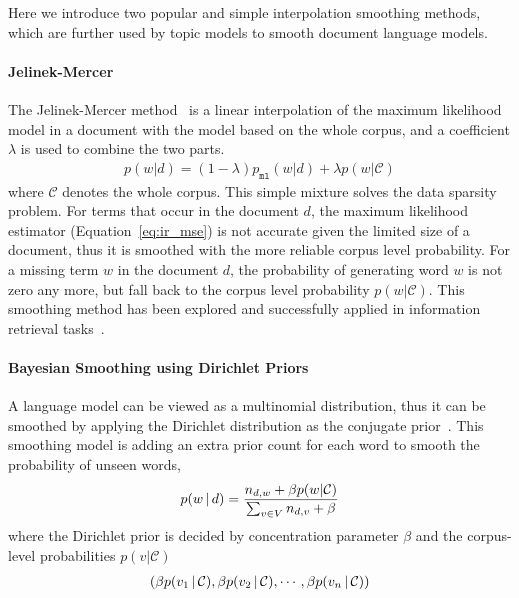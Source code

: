 Here we introduce two popular and simple interpolation smoothing
methods, which are further used by topic models to smooth document
language models.

\paragraph{Jelinek-Mercer}

The Jelinek-Mercer method~\citep{Jelinek-1980} is a linear
interpolation of the maximum likelihood model in a document with the
model based on the whole corpus, and a coefficient $\lambda$ is used
to combine the two parts.
\begin{align}
p(w|d) = (1 - \lambda) p_{\texttt{ml}}(w|d) + \lambda p(w|\mathcal{C})
\label{eq:lm-jr}
\end{align}
where $\mathcal{C}$ denotes the whole corpus. This simple mixture
solves the data sparsity problem. For terms that occur in the document
$d$, the maximum likelihood estimator (Equation~\ref{eq:ir_mse}) is
not accurate given the limited size of a document, thus it is smoothed
with the more reliable corpus level probability. For a missing term $w$
in the document $d$, the probability of generating word $w$ is not zero any more, but fall
back to the corpus level probability $p(w|\mathcal{C})$.
This smoothing method has been explored and successfully applied in information retrieval tasks~\citep{PonteCroft,song-99}.

\paragraph{Bayesian Smoothing using Dirichlet Priors}

A language model can be viewed as a multinomial distribution, thus it
can be smoothed by applying the Dirichlet distribution as the
conjugate prior~\citep{mackay95dirichlet}. This smoothing model is
adding an extra prior count for each word to smooth the probability of
unseen words,
\begin{align}
p(w \, | \, d) = \frac{n_{d,w} + \beta p(w|\mathcal{C})}{\sum_{v \in V} n_{d,v} + \beta}
\end{align}
where the Dirichlet prior is decided by concentration parameter $\beta$ and the
corpus-level probabilities $p(v|\mathcal{C})$
\begin{align}
(\beta p(v_1 \, | \, \mathcal{C}), \beta p(v_2 \, | \, \mathcal{C}), \cdots, \beta p(v_n \, | \, \mathcal{C}))
\label{eq:lm-bs}
\end{align}

